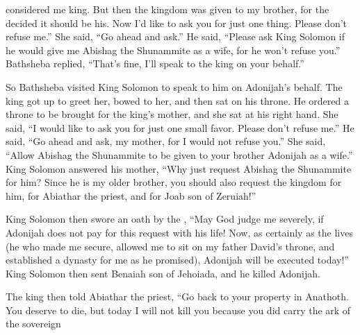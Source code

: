 {considered
me king.
But then
the kingdom
was
given to my brother,
for
the {}
decided it should be his.
Now
I’d like to ask
you for just one
thing.
Please
don’t
refuse
me.” She said,
“Go
ahead
and ask.”
He said,
“Please
ask
King
Solomon
if
he would give
me Abishag
the Shunammite
as a wife,
for
he won’t
refuse you.”
Bathsheba
replied,
“That’s
fine, I’ll
speak
to
the king on your behalf.”
\par }{\PP {}So
Bathsheba
visited
King
Solomon
to
speak
to him on
Adonijah’s
behalf. The king
got up
to greet
her, bowed
to her, and then sat
on
his throne.
He ordered
a throne
to be brought
for the king’s
mother,
and she sat
at his right hand.
She said,
“I
would like to ask
you for just one
small
favor.
Please
don’t
refuse
me.” He said, “Go
ahead
and ask,
my mother,
for
I would not
refuse you.”
She said,
“Allow
Abishag
the Shunammite
to be given to your brother
Adonijah
as a wife.”
King
Solomon
answered
his mother,
“Why
just request
Abishag
the Shunammite
for him? Since
he is my older
brother,
you should also request
the kingdom
for
him,
for Abiathar
the priest,
and for Joab
son
of Zeruiah!”
\par }{\PP {}King
Solomon
then swore
an oath by the
{}, “May
God
judge me severely,
if
Adonijah
does not pay for this
request
with his life!
Now,
as certainly as the
{}
lives
(he who
made me secure,
allowed me to sit
on
my father
David’s
throne,
and established a dynasty
for
me as
he promised), Adonijah
will be executed
today!”
King
Solomon
then sent
Benaiah
son
of Jehoiada,
and he killed Adonijah.
\par }{\PP {}The king
then told
Abiathar
the priest,
“Go
back to your property
in Anathoth.
You
deserve
to die,
but
today
I will not
kill
you
because
you did carry
the
ark
of the sovereign

}
